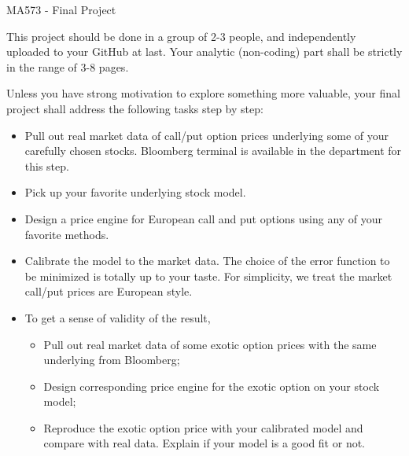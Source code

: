 \documentclass{article}
\begin{document}
\begin{center}
 MA573 - Final Project
\end{center}

This project should be done in a group of 2-3 people, and 
independently uploaded to your GitHub at last.
Your analytic (non-coding) part shall be strictly in the range of 3-8 pages. 




Unless you have strong motivation to explore something more valuable, your final project 
shall address the following tasks step by step: 
	

\begin{itemize}
\item Pull out real market data of call/put option prices 
underlying some of your carefully chosen stocks. Bloomberg terminal is 
available in the department for this step.
\item Pick up your favorite underlying stock model.
\item Design a price engine for European call and put options using 
any of your favorite methods. 
\item Calibrate the model to the 
market data. 
The choice of the error function to be minimized is totally up to your taste.
For simplicity, we treat the market call/put prices are European style.

\item 
To get a sense of validity of the result, 
\begin{itemize}
 \item Pull out real market data of some exotic option prices with the same underlying from Bloomberg;
 \item Design corresponding price engine for the exotic option on your stock model;
 \item Reproduce the exotic option price with your calibrated model and compare with real data. Explain if your model is a good fit or not.
\end{itemize}
\end{itemize}
\end{document}
